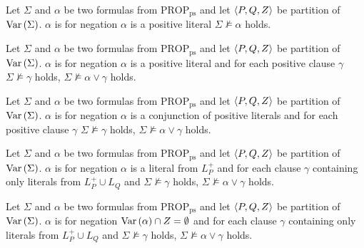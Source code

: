 \begin{defi}
Let $\Sigma$ and $\alpha$ be two formulas from $\mbox{PROP}_{\mbox{ps}}$ and let $\left\langle P,Q,Z\right\rangle$ be partition of $\mbox{Var}\left(\Sigma\right)$. $\alpha$ is  for negation \iffTx{} $\alpha$ is a positive literal \stTx{} $\Sigma\nvDash\alpha$ holds.
\cite{conf/ijcai/Coste-MarquisM99}
\end{defi}

\begin{defi}
Let $\Sigma$ and $\alpha$ be two formulas from $\mbox{PROP}_{\mbox{ps}}$ and let $\left\langle P,Q,Z\right\rangle$ be partition of $\mbox{Var}\left(\Sigma\right)$. $\alpha$ is  for negation \iffTx{} $\alpha$ is a positive literal and for each positive clause $\gamma$ \stTx{} $\Sigma\nvDash\gamma$ holds, $\Sigma\nvDash\alpha\vee\gamma$ holds.
\cite{conf/ijcai/Coste-MarquisM99}
\end{defi}

\begin{defi}
Let $\Sigma$ and $\alpha$ be two formulas from $\mbox{PROP}_{\mbox{ps}}$ and let $\left\langle P,Q,Z\right\rangle$ be partition of $\mbox{Var}\left(\Sigma\right)$. $\alpha$ is  for negation \iffTx{} $\alpha$ is a conjunction of positive literals and for each positive clause $\gamma$ \stTx{} $\Sigma\nvDash\gamma$ holds, $\Sigma\nvDash\alpha\vee\gamma$ holds.
\cite{conf/ijcai/Coste-MarquisM99}
\end{defi}

\begin{defi}
Let $\Sigma$ and $\alpha$ be two formulas from $\mbox{PROP}_{\mbox{ps}}$ and let $\left\langle P,Q,Z\right\rangle$ be partition of $\mbox{Var}\left(\Sigma\right)$. $\alpha$ is  for negation \iffTx{} $\alpha$ is a literal from $L_P^+$ and for each clause $\gamma$ containing only literals from $L_P^+\cup L_Q$  and \stTx{} $\Sigma\nvDash\gamma$ holds, $\Sigma\nvDash\alpha\vee\gamma$ holds.
\cite{conf/ijcai/Coste-MarquisM99}
\end{defi}

\begin{defi}
Let $\Sigma$ and $\alpha$ be two formulas from $\mbox{PROP}_{\mbox{ps}}$ and let $\left\langle P,Q,Z\right\rangle$ be partition of $\mbox{Var}\left(\Sigma\right)$. $\alpha$ is  for negation \iffTx{} $\mbox{Var}\left(\alpha\right)\cap Z=\emptyset$ and for each clause $\gamma$ containing only literals from $L_P^+\cup L_Q$  and \stTx{} $\Sigma\nvDash\gamma$ holds, $\Sigma\nvDash\alpha\vee\gamma$ holds.
\cite{conf/ijcai/Coste-MarquisM99}
\end{defi}

